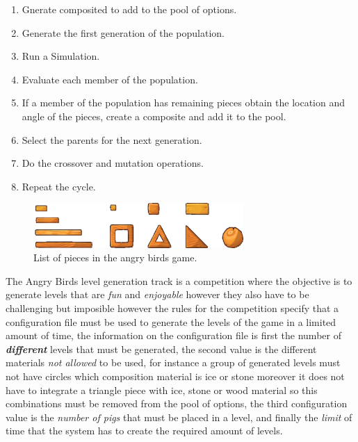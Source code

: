 \documentclass[conference]{IEEEtran}
\begin{document}

\begin{enumerate}
\item Gnerate composited to add to the pool of options.
\item Generate the first generation of the population.
\item Run a Simulation.
\item Evaluate each member of the population.
\item If a member of the population has remaining pieces obtain the location and
angle of the pieces, create a composite and add it to the pool.
\item Select the parents for the next generation.
\item Do the crossover and mutation operations.
\item Repeat the cycle.
\end{enumerate}

\begin{figure}[htbp]
\centerline{\includegraphics[width=80mm]{Images/list_pieces.png}}
\caption{List of pieces in the angry birds game.}
\label{piece_list}
\end{figure}


The Angry Birds level generation track is a competition where the objective is 
to generate levels that are \textit{fun} and \textit{enjoyable} however they 
also have to be challenging but imposible however the rules for the competition 
specify that a configuration file must be used to
generate the levels of the game in a limited amount of time, the information on
the configuration file is first the number of \textbf{\textit{different}} levels
that must be generated, the second value is the different materials \textit{not
allowed} to be used, for instance a group of generated levels must not have
circles which composition material is ice or stone moreover it does not have to
integrate a triangle piece with ice, stone or wood material so this combinations
must be removed from the pool of options, the third configuration value is the
\textit{number of pigs} that must be placed in a level, and finally the
\textit{limit} of time that the system has to create the required amount of
levels.
\end{document}
